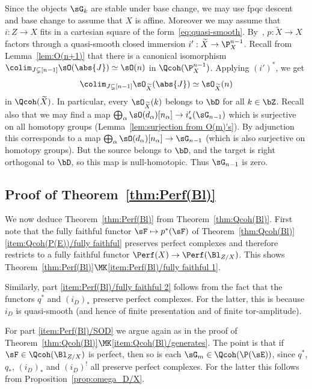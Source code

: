 Since the objects $\sG_k$ are stable under base change, we may use fpqc descent and base change to assume that $X$ is affine. Moreover we may assume that $i: Z\to X$ fits in a cartesian square of the form~\eqref{eq:quasi-smooth}. By~\cite[3.3.6]{KhanBlowup}, $p : \widetilde{X} \to X$ factors through a quasi-smooth closed immersion $i' : \widetilde{X} \to \P^{n-1}_X$. Recall from Lemma~\ref{lem:O(n+1)} that there is a canonical isomorphism $\colim_{J \subsetneq [n-1]} \sO(\abs{J}) \simeq \sO(n)$ in $\Qcoh(\P^{n-1}_X)$. Applying $(i')^*$, we get 
\[
\colim_{J \subsetneq [n-1]} \sO_{\widetilde{X}}(\abs{J}) \simeq \sO_{\widetilde{X}}(n) 
\]
in $\Qcoh(\widetilde{X})$.
In particular, every $\sO_{\widetilde{X}}(k)$ belongs to $\bD$ for all $k\in\bZ$. Recall also that we may find a map $\bigoplus_\alpha \sO(d_\alpha)[n_\alpha] \to i'_*(\sG_{n-1})$ which is surjective on all homotopy groups (Lemma~\ref{lem:surjection from O(m)'s}). By adjunction this corresponds to a map $\bigoplus_\alpha \sO(d_\alpha)[n_\alpha] \to \sG_{n-1}$ (which is also surjective on homotopy groups). But the source belongs to $\bD$, and the target is right orthogonal to $\bD$, so this map is null-homotopic. Thus $\sG_{n-1}$ is zero.

\subsection{Proof of Theorem~\ref{thm:Perf(Bl)}}\label{ssec:proof of Perf(Bl)}

We now deduce Theorem~\ref{thm:Perf(Bl)} from Theorem~\ref{thm:Qcoh(Bl)}. First note that the fully faithful functor $\sF \mapsto p^*(\sF)$ of Theorem~\ref{thm:Qcoh(Bl)}
\eqref{item:Qcoh(P(E))/fully faithful} preserves perfect complexes and therefore restricts to a fully faithful functor $\Perf(X) \to \Perf(\Bl_{Z/X})$. This shows Theorem~\ref{thm:Perf(Bl)}$\MK$\eqref{item:Perf(Bl)/fully faithful 1}.

Similarly, part
\eqref{item:Perf(Bl)/fully faithful 2} follows from the fact that the functors $q^*$ and $(i_D)_*$ preserve perfect complexes. For the latter, this is because $i_D$ is quasi-smooth (and hence of finite presentation and of finite tor-amplitude).

For part
\eqref{item:Perf(Bl)/SOD} we argue again as in the proof of Theorem~\ref{thm:Qcoh(Bl)}$\MK$\eqref{item:Qcoh(Bl)/generates}. The point is that if $\sF \in \Qcoh(\Bl_{Z/X})$ is perfect, then so is each $\sG_m \in \Qcoh(\P(\sE))$, since $q^*$, $q_*$, $(i_D)_*$ and $(i_D)^!$ all preserve perfect complexes. For the latter this follows from Proposition~\ref{prop:omega_D/X}.
\goodbreak



